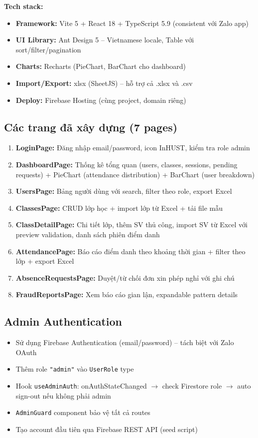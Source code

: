 \documentclass{article}
\begin{document}
\textbf{Tech stack:}
\begin{itemize}[leftmargin=1.5em]
  \item \textbf{Framework:} Vite 5 + React 18 + TypeScript 5.9 (consistent với Zalo app)
  \item \textbf{UI Library:} Ant Design 5 -- Vietnamese locale, Table với sort/filter/pagination
  \item \textbf{Charts:} Recharts (PieChart, BarChart cho dashboard)
  \item \textbf{Import/Export:} xlsx (SheetJS) -- hỗ trợ cả .xlsx và .csv
  \item \textbf{Deploy:} Firebase Hosting (cùng project, domain riêng)
\end{itemize}

\subsection{Các trang đã xây dựng (7 pages)}

\begin{enumerate}[leftmargin=1.5em]
  \item \textbf{LoginPage:} Đăng nhập email/password, icon InHUST, kiểm tra role admin
  \item \textbf{DashboardPage:} Thống kê tổng quan (users, classes, sessions, pending requests) + PieChart (attendance distribution) + BarChart (user breakdown)
  \item \textbf{UsersPage:} Bảng người dùng với search, filter theo role, export Excel
  \item \textbf{ClassesPage:} CRUD lớp học + import lớp từ Excel + tải file mẫu
  \item \textbf{ClassDetailPage:} Chi tiết lớp, thêm SV thủ công, import SV từ Excel với preview validation, danh sách phiên điểm danh
  \item \textbf{AttendancePage:} Báo cáo điểm danh theo khoảng thời gian + filter theo lớp + export Excel
  \item \textbf{AbsenceRequestsPage:} Duyệt/từ chối đơn xin phép nghỉ với ghi chú
  \item \textbf{FraudReportsPage:} Xem báo cáo gian lận, expandable pattern details
\end{enumerate}

\subsection{Admin Authentication}

\begin{itemize}[leftmargin=1.5em]
  \item Sử dụng Firebase Authentication (email/password) -- tách biệt với Zalo OAuth
  \item Thêm role \texttt{"admin"} vào \texttt{UserRole} type
  \item Hook \texttt{useAdminAuth}: onAuthStateChanged $\rightarrow$ check Firestore role $\rightarrow$ auto sign-out nếu không phải admin
  \item \texttt{AdminGuard} component bảo vệ tất cả routes
  \item Tạo account đầu tiên qua Firebase REST API (seed script)
\end{itemize}
\end{document}

